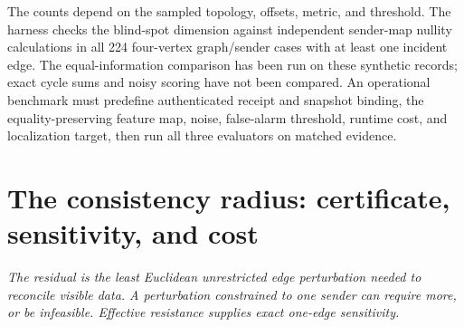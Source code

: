 \documentclass[11pt,a4paper]{article}
\newcommand{\onebreath}[1]{\begin{center}\emph{#1}\end{center}}
\begin{document}
The counts depend on the sampled topology, offsets, metric, and threshold. The harness checks the blind-spot dimension against independent sender-map nullity calculations in all 224 four-vertex graph/sender cases with at least one incident edge. The equal-information comparison has been
run on these synthetic records; exact cycle sums and noisy scoring have not been compared. An operational benchmark
must predefine authenticated receipt and snapshot binding, the equality-preserving feature map, noise, false-alarm
threshold, runtime cost, and localization target, then run all three evaluators on matched evidence.

\section{The consistency radius: certificate, sensitivity, and cost}\label{sec:radius}

\onebreath{The residual is the least Euclidean unrestricted edge perturbation needed to reconcile visible data. A perturbation constrained to one sender can require more, or be infeasible. Effective resistance supplies exact one-edge sensitivity.}
\end{document}
